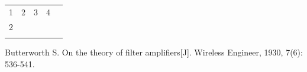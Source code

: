 \documentclass[12pt, a4paper]{article}
\begin{document}
\usepackage{multirow}
\begin{table}[]
	\begin{tabular}{lllll}
	1                  & 2 & 3 & 4 &  \\
	\multirow{2}{*}{2} &   &   &   &  \\
					   &   &   &   &  \\
					   &   &   &   & 
	\end{tabular}
	\end{table}

\begin{thebibliography}{4}
	Butterworth S. On the theory of filter amplifiers[J]. Wireless Engineer, 1930, 7(6): 536-541.
\end{thebibliography}
\end{document}
